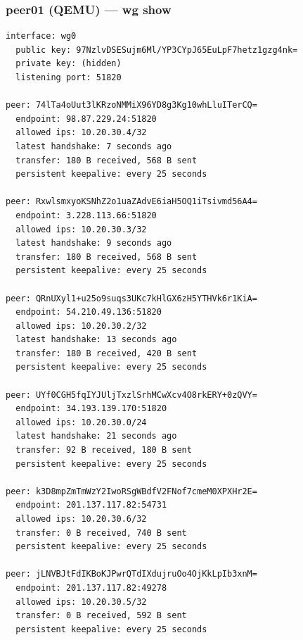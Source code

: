 \documentclass[11pt,a4paper]{article}
\begin{document}
\subsubsection*{peer01 (QEMU) — wg show}
\begin{lstlisting}
interface: wg0
  public key: 97NzlvDSESujm6Ml/YP3CYpJ65EuLpF7hetz1gzg4nk=
  private key: (hidden)
  listening port: 51820

peer: 74lTa4oUut3lKRzoNMMiX96YD8g3Kg10whLluITerCQ=
  endpoint: 98.87.229.24:51820
  allowed ips: 10.20.30.4/32
  latest handshake: 7 seconds ago
  transfer: 180 B received, 568 B sent
  persistent keepalive: every 25 seconds

peer: RxwlsmxyoKSNhZ2o1uaZAdvE6iaH5OQ1iTsivmd56A4=
  endpoint: 3.228.113.66:51820
  allowed ips: 10.20.30.3/32
  latest handshake: 9 seconds ago
  transfer: 180 B received, 568 B sent
  persistent keepalive: every 25 seconds

peer: QRnUXyl1+u25o9suqs3UKc7kHlGX6zH5YTHVk6r1KiA=
  endpoint: 54.210.49.136:51820
  allowed ips: 10.20.30.2/32
  latest handshake: 13 seconds ago
  transfer: 180 B received, 420 B sent
  persistent keepalive: every 25 seconds

peer: UYf0CGH5fqIYJUljTxzlSrhMCwXcv4O8rkERY+0zQVY=
  endpoint: 34.193.139.170:51820
  allowed ips: 10.20.30.0/24
  latest handshake: 21 seconds ago
  transfer: 92 B received, 180 B sent
  persistent keepalive: every 25 seconds

peer: k3D8mpZmTmWzY2IwoRSgWBdfV2FNof7cmeM0XPXHr2E=
  endpoint: 201.137.117.82:54731
  allowed ips: 10.20.30.6/32
  transfer: 0 B received, 740 B sent
  persistent keepalive: every 25 seconds

peer: jLNVBJtFdIKBoKJPwrQTdIXdujruOo4OjKkLpIb3xnM=
  endpoint: 201.137.117.82:49278
  allowed ips: 10.20.30.5/32
  transfer: 0 B received, 592 B sent
  persistent keepalive: every 25 seconds

\end{lstlisting}
\end{document}
